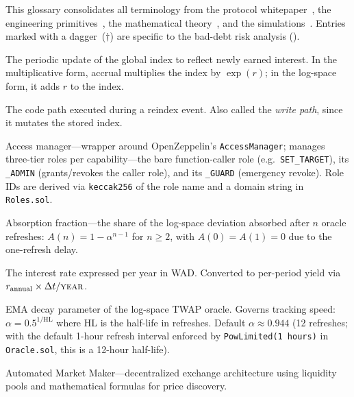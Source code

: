 \documentclass[10pt,a4paper,twocolumn]{article}
\begin{document}
\noindent This glossary consolidates all terminology from the protocol whitepaper~\cite{wp}, the engineering primitives~\cite{lck,log}, the mathematical theory~\cite{mtp}, and the simulations~\cite{sim}. Entries marked with a dagger~($\dagger$) are specific to the bad-debt risk analysis (\cite{sim}).

\begin{description}[style=nextline, leftmargin=2.5em, labelindent=0em, font=\normalfont\bfseries]


\item[Accrual] The periodic update of the global index to reflect newly earned interest. In the multiplicative form, accrual multiplies the index by $\exp(r)$; in the log-space form, it adds $r$ to the index.

\item[Accrual Path] The code path executed during a reindex event. Also called the \emph{write path}, since it mutates the stored index.

\item[Acma] Access manager---wrapper around OpenZeppelin's \texttt{AccessManager}; manages three-tier roles per capability---the bare function-caller role (e.g.\ \texttt{SET\_TARGET}), its \texttt{\_ADMIN} (grants/revokes the caller role), and its \texttt{\_GUARD} (emergency revoke). Role IDs are derived via \texttt{keccak256} of the role name and a domain string in \texttt{Roles.sol}.

\item[$A(n)$\,$\dagger$] Absorption fraction---the share of the log-space deviation absorbed after $n$ oracle refreshes: $A(n) = 1 - \alpha^{n-1}$ for $n \geq 2$, with $A(0) = A(1) = 0$ due to the one-refresh delay.

\item[Annualised Rate ($r_{\text{annual}}$)] The interest rate expressed per year in WAD. Converted to per-period yield via $r_{\text{annual}} \times \Delta t / \textsc{year}$.

\item[$\alpha$\,$\dagger$] EMA decay parameter of the log-space TWAP oracle. Governs tracking speed: $\alpha = 0.5^{1/\text{HL}}$ where HL is the half-life in refreshes. Default $\alpha \approx 0.944$ (12 refreshes; with the default 1-hour refresh interval enforced by \texttt{PowLimited(1 hours)} in \texttt{Oracle.sol}, this is a 12-hour half-life).

\item[AMM] Automated Market Maker---decentralized exchange architecture using liquidity pools and mathematical formulas for price discovery.


\end{description}
\end{document}

